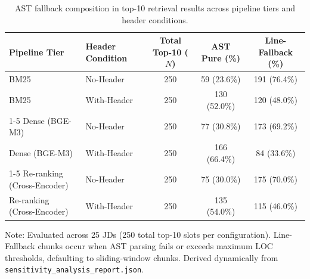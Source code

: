 \begin{table}[t]
\caption{AST fallback composition in top-10 retrieval results across pipeline tiers and header conditions.}
\label{tab:fallback_composition}
\centering\footnotesize
\setlength{\tabcolsep}{6pt}
\begin{threeparttable}
\begin{tabular}{@{}llccc@{}}
\toprule
Pipeline Tier & Header Condition & Total Top-10 ($N$) & AST Pure (\%) & Line-Fallback (\%) \\
\midrule
BM25 & No-Header & 250 & 59 (23.6\%) & 191 (76.4\%) \\
BM25 & With-Header & 250 & 130 (52.0\%) & 120 (48.0\%) \\
\cmidrule(lr){1-5}
Dense (BGE-M3) & No-Header & 250 & 77 (30.8\%) & 173 (69.2\%) \\
Dense (BGE-M3) & With-Header & 250 & 166 (66.4\%) & 84 (33.6\%) \\
\cmidrule(lr){1-5}
Re-ranking (Cross-Encoder) & No-Header & 250 & 75 (30.0\%) & 175 (70.0\%) \\
Re-ranking (Cross-Encoder) & With-Header & 250 & 135 (54.0\%) & 115 (46.0\%) \\
\bottomrule
\end{tabular}
\begin{tablenotes}\footnotesize
\item[] Note: Evaluated across 25 JDs (250 total top-10 slots per configuration). Line-Fallback chunks occur when AST parsing fails or exceeds maximum LOC thresholds, defaulting to sliding-window chunks. Derived dynamically from \texttt{sensitivity\_analysis\_report.json}.
\end{tablenotes}
\end{threeparttable}
\end{table}